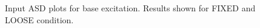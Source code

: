 \documentclass[paper=a4, fontsize=12pt]{scrartcl} %
\begin{document}
\begin{figure}[H]
{		\label{fig:baseC_wtWeight_ASDinput}
		}
		\quad
		\caption{Input ASD plots for base excitation. Results shown for FIXED and LOOSE condition.}
		\label{fig:InputASDBaseFigs}
	\end{figure}
%
\end{document}
